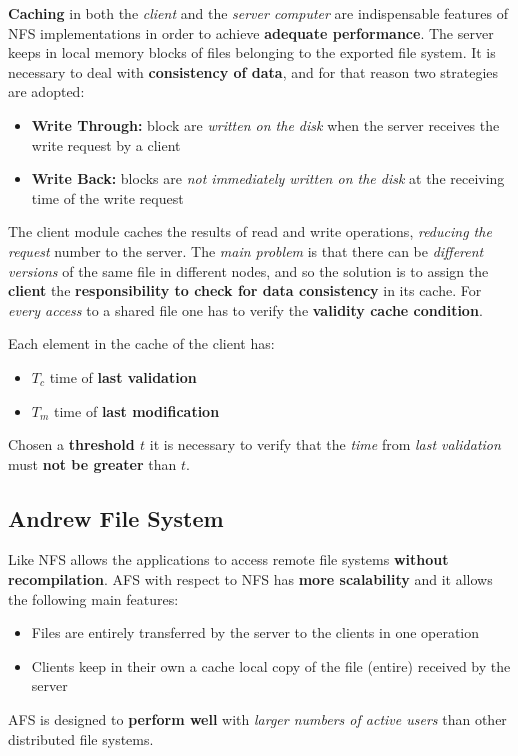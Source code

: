 \textbf{Caching} in both the \textit{client} and the \textit{server computer} are indispensable features of NFS implementations in order to achieve \textbf{adequate performance}. The server keeps in local memory blocks of files belonging to the exported file system. It is necessary to deal with \textbf{consistency of data}, and for that reason two strategies are adopted:
\begin{itemize}
    \item \textbf{Write Through:} block are \textit{written on the disk} when the server receives the write request by a client
    \item \textbf{Write Back:} blocks are \textit{not immediately written on the disk} at the receiving time of the write request
\end{itemize}
The client module caches the results of read and write operations, \textit{reducing the request} number to the server. The \textit{main problem} is that there can be \textit{different versions} of the same file in different nodes, and so the solution is to assign the \textbf{client} the \textbf{responsibility to check for data consistency} in its cache. For \textit{every access} to a shared file one has to verify the \textbf{validity cache condition}.

Each element in the cache of the client has:
\begin{itemize}
    \item \(T_c\) time of \textbf{last validation}
    \item \(T_m\) time of \textbf{last modification}
\end{itemize}
Chosen a \textbf{threshold \(t\)} it is necessary to verify that the \textit{time} from \textit{last validation} must \textbf{not be greater} than \(t\).

\subsection{Andrew File System}
Like NFS allows the applications to access remote file systems \textbf{without recompilation}. AFS with respect to NFS has \textbf{more scalability} and it allows the following main features:
\begin{itemize}
    \item Files are entirely transferred by the server to the clients in one operation
    \item Clients keep in their own a cache local copy of the file (entire) received by the server
\end{itemize}
AFS is designed to \textbf{perform well} with \textit{larger numbers of active users} than other distributed file systems.

